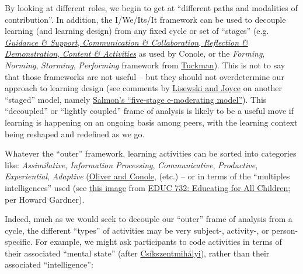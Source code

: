 By looking at different roles, we begin to get at ``different paths and
modalities of contribution''. In addition, the I/We/Its/It framework can
be used to decouple learning (and learning design) from any fixed cycle
or set of ``stages'' (e.g.
\href{http://www.slideshare.net/GrainneConole/conole-workshop-ascilitefinal}{\emph{Guidance
\& Support}, \emph{Communication \& Collaboration}, \emph{Reflection \&
Demonstration}, \emph{Content \& Activities}} as used by Conole, or the
\emph{Forming}, \emph{Norming}, \emph{Storming}, \emph{Performing}
framework from
\href{http://en.wikipedia.org/wiki/Tuckman\%27s\_stages\_of\_group\_development}{Tuckman}).
This is not to say that those frameworks are not useful -- but they
should not overdetermine our approach to learning design (see comments
by
\href{http://scholar.google.com/scholar?cluster=11211624493583853867\&hl=en\&as\_sdt=0,14}{Lisewski
and Joyce} on another ``staged'' model, namely
\href{http://www.amazon.com/exec/obidos/ISBN=0415335442}{Salmon's
``five-stage e-moderating model''}). This ``decoupled'' or ``lightly
coupled'' frame of analysis is likely to be a useful move if learning is
happening on an ongoing basis among peers, with the learning context
being reshaped and redefined as we go.

Whatever the ``outer'' framework, learning activities can be sorted into
categories like: \emph{Assimilative}, \emph{Information Processing},
\emph{Communicative}, \emph{Productive}, \emph{Experiential},
\emph{Adaptive}
(\href{http://scholar.google.com/scholar?cluster=8288002155802963960\&hl=en\&as\_sdt=0,14}{Oliver
and Conole}, (etc.) -- or in terms of the ``multiples intelligences''
used (see
\href{http://educ732.courseblock.com/wp-content/uploads/2011/05/multiple\_intelligences.jpg}{this
image} from \href{http://educ732.courseblock.com/}{EDUC 732: Educating
for All Children}; per Howard Gardner).

Indeed, much as we would seek to decouple our ``outer'' frame of
analysis from a cycle, the different ``types'' of activities may be very
subject-, activity-, or person-specific. For example, we might ask
participants to code activities in terms of their associated ``mental
state'' (after
\href{http://en.wikipedia.org/wiki/Mihaly\_Csikszentmihalyi}{Csíkszentmihályi}),
rather than their associated ``intelligence'':

